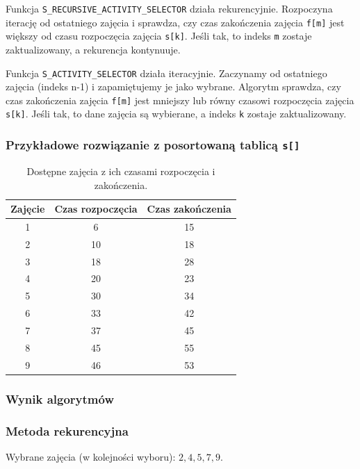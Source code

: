 \documentclass{article}
\begin{document}
	Funkcja \texttt{S\_RECURSIVE\_ACTIVITY\_SELECTOR} działa rekurencyjnie. Rozpoczyna iterację od ostatniego zajęcia i sprawdza, czy czas zakończenia zajęcia \texttt{f[m]} jest większy od czasu rozpoczęcia zajęcia \texttt{s[k]}. Jeśli tak, to indeks \texttt{m} zostaje zaktualizowany, a rekurencja kontynuuje.
	
	Funkcja \texttt{S\_ACTIVITY\_SELECTOR} działa iteracyjnie. Zaczynamy od ostatniego zajęcia (indeks n-1) i zapamiętujemy je jako wybrane. Algorytm sprawdza, czy czas zakończenia zajęcia \texttt{f[m]} jest mniejszy lub równy czasowi rozpoczęcia zajęcia \texttt{s[k]}. Jeśli tak, to dane zajęcia są wybierane, a indeks \texttt{k} zostaje zaktualizowany.
	
		
		\subsubsection*{Przykładowe rozwiązanie z posortowaną tablicą \texttt{s[]}}
	
	\begin{table}[H]
		\centering
		\begin{tabular}{|c|c|c|}
			\hline
			\textbf{Zajęcie} & \textbf{Czas rozpoczęcia} & \textbf{Czas zakończenia} \\ \hline
			1 & 6 & 15 \\ \hline
			2 & 10 & 18 \\ \hline
			3 & 18 & 28 \\ \hline
			4 & 20 & 23 \\ \hline
			5 & 30 & 34 \\ \hline
			6 & 33 & 42 \\ \hline
			7 & 37 & 45 \\ \hline
			8 & 45 & 55 \\ \hline
			9 & 46 & 53 \\ \hline
		\end{tabular}
		\caption{Dostępne zajęcia z ich czasami rozpoczęcia i zakończenia.}
	\end{table}
	
	\subsubsection*{Wynik algorytmów}
	
	\subsubsection*{Metoda rekurencyjna}
	Wybrane zajęcia (w kolejności wyboru): \(2, 4, 5, 7, 9\).
\end{document}
